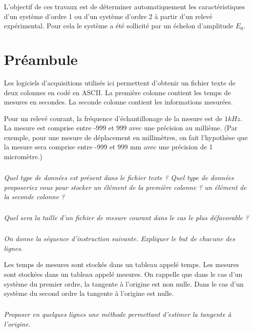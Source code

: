 \documentclass[10pt]{article}
\begin{document}




 \renewcommand{\baselinestretch}{1.2}
\setlength{\parskip}{2ex plus 0.5ex minus 0.2ex}

\begin{obj}
L'objectif de ces travaux est de déterminer automatiquement les caractéristiques d'un système d'ordre 1 ou d'un système d'ordre 2 à partir d'un relevé expérimental. Pour cela le système a été sollicité par un échelon d'amplitude $E_0$.
\end{obj}

\section{Préambule}
Les logiciels d'acquisitions utilisés ici permettent d'obtenir un fichier texte de deux colonnes en codé en ASCII. La première colonne contient les temps de mesures en secondes. La seconde colonne contient les informations mesurées. 

Pour un relevé courant, la fréquence d'échantillonage de la mesure est de $1 kHz$. La mesure est comprise entre -999 et 999 avec une précision au millième. (Par exemple, pour une mesure de déplacement en millimètres, on fait l'hypothèse que la mesure sera comprise entre -999 et 999 mm avec une précision de 1 micromètre.)


\subparagraph{}
\textit{Quel type de données est présent dans le fichier texte ? Quel type de données proposeriez vous pour stocker un élément de la première colonne ? un élément de la seconde colonne ?}

\subparagraph{}
\textit{Quel sera la taille d'un fichier de mesure courant dans le cas le plus défavorable ?}

\subparagraph{}
\textit{On donne la séquence d'instruction suivante. Expliquer le but de chacune des lignes.}
\begin{py}
\begin{python}
\end{python}
\end{py}

Les temps de mesures sont stockés dans un tableau appelé \textsf{temps}. Les mesures sont stockées dans un tableau appelé \textsf{mesures}. On rappelle que dans le cas d'un système du premier ordre, la tangente à l'origine est non nulle. Dans le cas d'un système du second ordre la tangente à l'origine est nulle.


\subparagraph{}
\textit{Proposer en quelques lignes une méthode permettant d'estimer la tangente à l'origine.}
 
\end{document}
